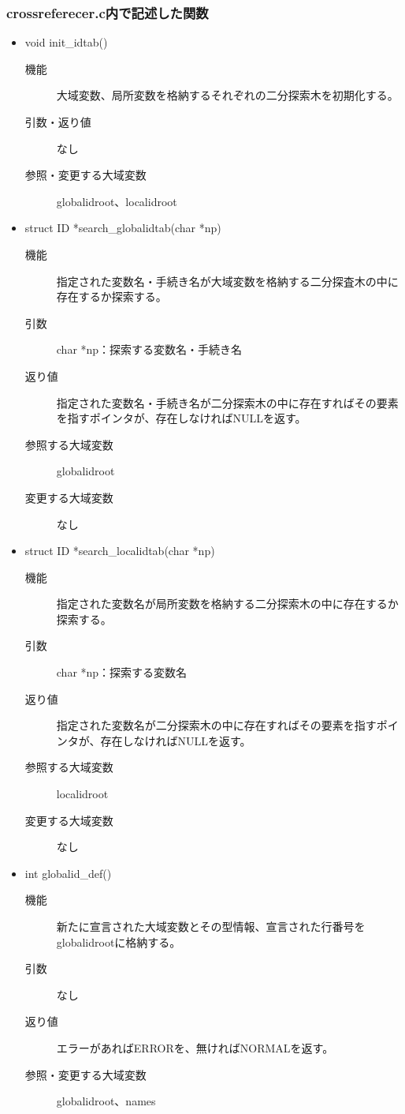 \documentclass{jarticle}
\begin{document}
\subsubsection{crossreferecer.c内で記述した関数}
\begin{itemize}
  \item void init\_idtab()
  \begin{description}
\item[機能]大域変数、局所変数を格納するそれぞれの二分探索木を初期化する。
\item[引数・返り値]なし
\item[参照・変更する大域変数]globalidroot、localidroot
\end{description}
\item struct ID *search\_globalidtab(char *np)
\begin{description}
\item[機能]指定された変数名・手続き名が大域変数を格納する二分探査木の中に存在するか探索する。
\item[引数]char *np：探索する変数名・手続き名
\item[返り値]指定された変数名・手続き名が二分探索木の中に存在すればその要素を指すポインタが、存在しなければNULLを返す。
\item[参照する大域変数]globalidroot
\item[変更する大域変数]なし
\end{description}
\item struct ID *search\_localidtab(char *np)
\begin{description}
\item[機能]指定された変数名が局所変数を格納する二分探索木の中に存在するか探索する。
\item[引数]char *np：探索する変数名
\item[返り値]指定された変数名が二分探索木の中に存在すればその要素を指すポインタが、存在しなければNULLを返す。
\item[参照する大域変数]localidroot
\item[変更する大域変数]なし
\end{description}
\item int globalid\_def()
\begin{description}
\item[機能]新たに宣言された大域変数とその型情報、宣言された行番号をglobalidrootに格納する。
\item[引数]なし
\item[返り値]エラーがあればERRORを、無ければNORMALを返す。
\item[参照・変更する大域変数]globalidroot、names

\end{description}
\end{itemize}
\end{document}

